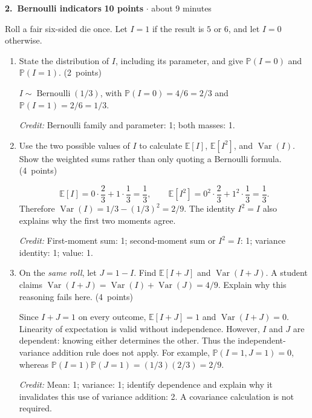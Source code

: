 \documentclass[11pt,letterpaper]{article}
\newcommand{\Prob}{\mathbb P}
\newcommand{\E}{\mathbb E}
\DeclareMathOperator{\Var}{Var}
\newcommand{\partpts}[1]{\unskip\nobreak\hspace{.3em}%
  \mbox{\small\color{muted}(#1 points)}}
\newcommand{\credit}[1]{\par{\footnotesize\color{muted}\textit{Credit:} #1}}
\newcommand{\problem}[4]{\par\addvspace{8pt}%
  {\large\bfseries\color{indigo}#1.\ #2}\hfill
  {\small\color{muted}\textbf{#3 points} $\cdot$ about #4 minutes}\par\nobreak}
\begin{document}
\newpage
\problem{2}{Bernoulli indicators}{10}{9}
Roll a fair six-sided die once. Let $I=1$ if the result is $5$ or $6$,
and let $I=0$ otherwise.
\begin{enumerate}
  \item State the distribution of $I$, including its parameter, and give
  $\Prob(I=0)$ and $\Prob(I=1)$. \partpts{2}
  \begin{solution}[1.25in]
    $I\sim\operatorname{Bernoulli}(1/3)$, with
    $\Prob(I=0)=4/6=2/3$ and $\Prob(I=1)=2/6=1/3$.
    \credit{Bernoulli family and parameter: 1; both masses: 1.}
  \end{solution}

  \item Use the two possible values of $I$ to calculate $\E[I]$,
  $\E[I^2]$, and $\Var(I)$. Show the weighted sums rather than only
  quoting a Bernoulli formula. \partpts{4}
  \begin{solution}[2in]
    \[
      \E[I]=0\cdot\frac23+1\cdot\frac13=\frac13,
      \qquad
      \E[I^2]=0^2\cdot\frac23+1^2\cdot\frac13=\frac13.
    \]
    Therefore $\Var(I)=1/3-(1/3)^2=2/9$.
    The identity $I^2=I$ also explains why the first two moments agree.
    \credit{First-moment sum: 1; second-moment sum or $I^2=I$: 1;
    variance identity: 1; value: 1.}
  \end{solution}

  \item On the \emph{same roll}, let $J=1-I$. Find $\E[I+J]$ and
  $\Var(I+J)$. A student claims
  $\Var(I+J)=\Var(I)+\Var(J)=4/9$.
  Explain why this reasoning fails here. \partpts{4}
  \begin{solution}[2.05in]
    Since $I+J=1$ on every outcome, $\E[I+J]=1$ and
    $\Var(I+J)=0$. Linearity of expectation is valid without independence.
    However, $I$ and $J$ are dependent: knowing either determines the other.
    Thus the independent-variance addition rule does not apply.
    For example, $\Prob(I=1,J=1)=0$, whereas
    $\Prob(I=1)\Prob(J=1)=(1/3)(2/3)=2/9$.
    \credit{Mean: 1; variance: 1; identify dependence and explain why
    it invalidates this use of variance addition: 2. A covariance
    calculation is not required.}
  \end{solution}
\end{enumerate}
\end{document}
